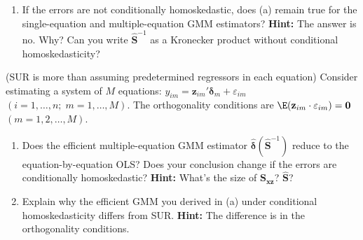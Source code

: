 \begin{problemset}
\begin{enumerate}[label=(\alph*)]
\item If the errors are not conditionally homoskedastic, does (a) remain true for
the single-equation and multiple-equation GMM estimators?
\textbf{Hint:} The answer is no. Why? Can you write $\widehat{\mathbf{S}}^{-1}$ as a
Kronecker product without conditional homoskedasticity?
\end{enumerate}

\exercise[8]
(SUR is more than assuming predetermined regressors in each equation)\quad
Consider estimating a system of $M$ equations:
$y_{im} = \mathbf{z}_{im}' \boldsymbol{\delta}_m + \varepsilon_{im}$
$(i = 1, \ldots, n;\; m = 1, \ldots, M)$.
The orthogonality conditions are
$\E(\mathbf{z}_{im} \cdot \varepsilon_{im}) = \mathbf{0}$
$(m = 1, 2, \ldots, M)$.

\begin{enumerate}[label=(\alph*)]
\item Does the efficient multiple-equation GMM estimator
$\hat{\boldsymbol{\delta}}(\widehat{\mathbf{S}}^{-1})$ reduce to the
equation-by-equation OLS? Does your conclusion change if the errors are
conditionally homoskedastic?
\textbf{Hint:} What's the size of $\mathbf{S}_{\mathbf{xz}}$? $\widehat{\mathbf{S}}$?

\item Explain why the efficient GMM you derived in (a) under conditional
homoskedasticity differs from SUR.
\textbf{Hint:} The difference is in the orthogonality conditions.
\end{enumerate}


\end{problemset}
